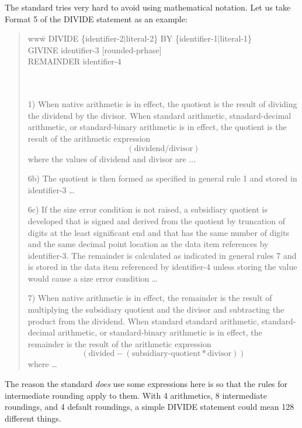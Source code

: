 \documentclass{article}
\begin{document}
The standard tries very hard to avoid using
mathematical notation.  Let us take Format 5 of the
DIVIDE statement as an example:
\begin{quote}
\begin{tabbing}
www\=\kill
DIVIDE \{identifier-2$|$literal-2\} BY \{identifier-1$|$literal-1\}\\
\> GIVINE identifier-3 [rounded-prhase]\\
\> REMAINDER identifier-4\\
\\
\\
\end{tabbing}

1) When native arithmetic is in effect, the quotient is the result
of dividing the dividend by the divisor.  When standard arithmetic,
stnadard-decimal arithmetic, or standard-binary arithmetic is in
effect, the quotient is the result of the arithmetic expression
$$(\mbox{dividend} / \mbox{divisor})$$
where the values of dividend and divisor are ...

6b) The quotient is then formed as specified in general rule 1
and stored in identifier-3 \dots

6c) If the size error condition is not raised, a subsidiary
quotient is developed that is signed and derived from the
quotient by truncation of digits at the least significant end
and that has the same number of digits and the same decimal point
location as the data item references by identifier-3.  The
remainder is calculated as indicated in general rules 7 and is
stored in the data item referenced by identifier-4 unless
storing the value would cause a size error condition \dots

7) When native arithmetic is in effect, the remainder is the
result of multiplying the subsidiary quotient and the divisor
and subtracting the product from the dividend.  When standard
standard arithmetic, standard-decimal arithmetic, or
standard-binary arithmetic is in effect, the remainder is the
result of the arithmetic expression
$$(\mbox{divided} - (\mbox{subsidiary-quotient} * \mbox{divisor}))$$
where \dots
\end{quote}

The reason the standard {\it does} use some expressions here is
so that the rules for intermediate rounding apply to them.  With
4 arithmetics, 8 intermediate roundings, and 4 default roundings,
a simple DIVIDE statement could mean 128 different things.
\end{document}
